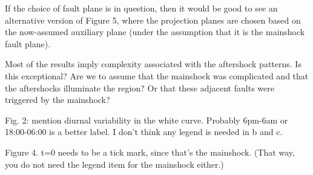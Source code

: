 \documentclass[10pt]{extarticle}
\begin{document}
\begin{Answer}
 \WorkInProgressRevTask
\end{Answer}
%
%


\begin{ReviewerComment}{1}
\noindent 
If the choice of fault plane is in question, then it would be good to see an alternative version of Figure 5, where the projection planes are chosen based on the now-assumed auxiliary plane (under the assumption that it is the mainshock fault plane).

\end{ReviewerComment}


\begin{Answer}
 \WorkInProgressRevTask
\end{Answer}
%
%


\begin{ReviewerComment}{1}
\noindent 
Most of the results imply complexity associated with the aftershock patterns. Is this exceptional? Are we to assume that the mainshock was complicated and that the aftershocks illuminate the region? Or that these adjacent faults were triggered by the mainshock?

\end{ReviewerComment}


\begin{Answer}
 \WorkInProgressRevTask
\end{Answer}
%
%




\begin{ReviewerComment}{1}
\noindent 
Fig. 2: mention diurnal variability in the white curve. Probably 6pm-6am or 18:00-06:00 is a better label. I don't think any legend is needed in b and c.

\end{ReviewerComment}


\begin{Answer}
 \WorkInProgressRevTask
\end{Answer}
%
%


\begin{ReviewerComment}{1}
\noindent 
Figure 4. t=0 needs to be a tick mark, since that's the mainshock. (That way, you do not need the legend item for the mainshock either.)

\end{ReviewerComment}


\begin{Answer}
 \WorkInProgressRevTask
\end{Answer}
%
%
\end{document}
